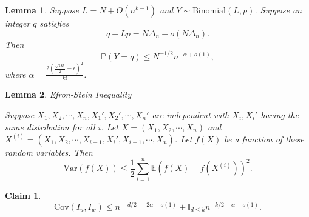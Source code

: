 \documentclass[10pt,a4paper]{amsart}
\newtheorem{lemma}{Lemma}
\newtheorem{claim}{Claim}
\renewcommand{\le}{\leqslant}
\renewcommand{\leq}{\leqslant}
\begin{document}
\begin{lemma} \label{lemma: binom approx}
Suppose $L=N+O(n^{k-1})$ and $Y\sim \text{Binomial}(L,p)$. Suppose an integer $q$ satisfies
$$q-Lp=N\Delta_n+o(N\Delta_n).$$
Then $$
\mathbb P(Y=q) \le N^{-1/2}n^{-\alpha+o(1)},
$$
where $\alpha=\frac{2(\frac{\sqrt{kk!}}{2}-\epsilon)^2}{k!}$.

\end{lemma}

\begin{lemma} Efron-Stein Inequality \label{lemma: efron}

Suppose $X_1,X_2,\cdots,X_n, X_1',X_2', \cdots, X_n'$ are independent with $X_i, X_i'$ having the same distribution for all $i$. Let $X=(X_1,X_2,\cdots,X_n)$ and $X^{(i)}=(X_1,X_2,\cdots, X_{i-1},X_i',X_{i+1},\cdots,X_{n})$. Let $f(X)$ be a function of these random variables. Then 
$$\text{Var}(f(X)) \leq \frac{1}{2}\sum_{i=1}^n \mathbb{E}(f(X)-f(X^{(i)}))^2.$$
\end{lemma}

\begin{claim}
$$
\text{Cov}(I_u,I_w) \le
n^{-\lceil d/2\rceil-2\alpha+o(1)} + \mathbb{I}_{{d\le k}} n^{-k/2-\alpha+o(1)}.
$$
\end{claim}
\end{document}
